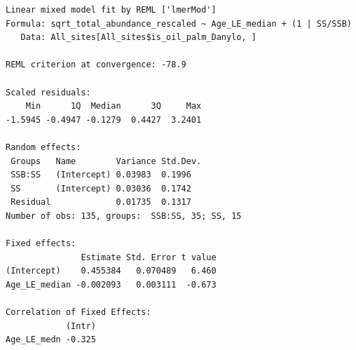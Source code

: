 \documentclass[
  letterpaper,
  DIV=11,
  numbers=noendperiod]{scrartcl}
\newenvironment{Shaded}{\begin{snugshade}}{\end{snugshade}}
\newcommand{\AttributeTok}[1]{\textcolor[rgb]{0.40,0.45,0.13}{#1}}
\newcommand{\DecValTok}[1]{\textcolor[rgb]{0.68,0.00,0.00}{#1}}
\newcommand{\FunctionTok}[1]{\textcolor[rgb]{0.28,0.35,0.67}{#1}}
\newcommand{\NormalTok}[1]{\textcolor[rgb]{0.00,0.23,0.31}{#1}}
\newcommand{\SpecialCharTok}[1]{\textcolor[rgb]{0.37,0.37,0.37}{#1}}
\begin{document}
\begin{Shaded}
\end{Shaded}

\begin{verbatim}
Linear mixed model fit by REML ['lmerMod']
Formula: sqrt_total_abundance_rescaled ~ Age_LE_median + (1 | SS/SSB)
   Data: All_sites[All_sites$is_oil_palm_Danylo, ]

REML criterion at convergence: -78.9

Scaled residuals: 
    Min      1Q  Median      3Q     Max 
-1.5945 -0.4947 -0.1279  0.4427  3.2401 

Random effects:
 Groups   Name        Variance Std.Dev.
 SSB:SS   (Intercept) 0.03983  0.1996  
 SS       (Intercept) 0.03036  0.1742  
 Residual             0.01735  0.1317  
Number of obs: 135, groups:  SSB:SS, 35; SS, 15

Fixed effects:
               Estimate Std. Error t value
(Intercept)    0.455384   0.070489   6.460
Age_LE_median -0.002093   0.003111  -0.673

Correlation of Fixed Effects:
            (Intr)
Age_LE_medn -0.325
\end{verbatim}

\begin{Shaded}
\end{Shaded}
\end{document}
